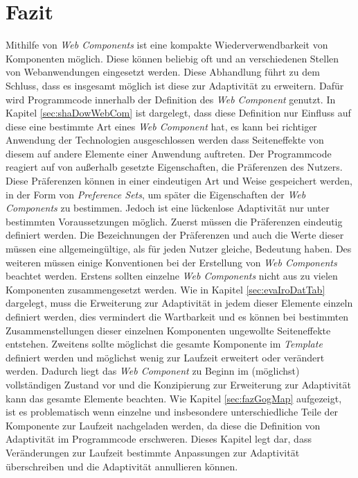 \documentclass[12pt, paper=a4, bibtotoc, toc=listof, headsepline=true, numbers=endperiod]{scrreprt}
\begin{document}
\chapter{Fazit}
Mithilfe von \emph{Web Components} ist eine kompakte Wiederverwendbarkeit von Komponenten möglich. Diese können beliebig oft und an verschiedenen Stellen von Webanwendungen eingesetzt werden. Diese Abhandlung führt zu dem Schluss, dass es insgesamt möglich ist diese zur Adaptivität zu erweitern. Dafür wird Programmcode innerhalb der Definition des \emph{Web Component} genutzt. In Kapitel \ref{sec:shaDowWebCom} ist dargelegt, dass diese Definition nur Einfluss auf diese eine bestimmte Art eines \emph{Web Component} hat, es kann bei richtiger Anwendung der Technologien ausgeschlossen werden dass Seiteneffekte von diesem auf andere Elemente einer Anwendung auftreten. Der Programmcode reagiert auf von außerhalb gesetzte Eigenschaften, die Präferenzen des Nutzers. Diese Präferenzen können in einer eindeutigen Art und Weise gespeichert werden, in der Form von \emph{Preference Sets}, um später die Eigenschaften der \emph{Web Components} zu bestimmen.
\newline
Jedoch ist eine lückenlose Adaptivität nur unter bestimmten Voraussetzungen möglich. Zuerst müssen die Präferenzen eindeutig definiert werden. Die Bezeichnungen der Präferenzen und auch die Werte dieser müssen eine allgemeingültige, als für jeden Nutzer gleiche, Bedeutung haben. Des weiteren müssen einige Konventionen bei der Erstellung von \emph{Web Components} beachtet werden. Erstens sollten einzelne \emph{Web Components} nicht aus zu vielen Komponenten zusammengesetzt werden. Wie in Kapitel \ref{sec:evaIroDatTab} dargelegt, muss die Erweiterung zur Adaptivität in jedem dieser Elemente einzeln definiert werden,  dies vermindert die Wartbarkeit und es können bei bestimmten Zusammenstellungen dieser einzelnen Komponenten ungewollte Seiteneffekte entstehen. Zweitens sollte möglichst die gesamte Komponente im \emph{Template} definiert werden und möglichst wenig zur Laufzeit erweitert oder verändert werden. Dadurch liegt das \emph{Web Component} zu Beginn im (möglichst) vollständigen Zustand vor und die Konzipierung zur Erweiterung zur Adaptivität kann das gesamte Elemente beachten. Wie Kapitel \ref{sec:fazGogMap} aufgezeigt, ist es problematisch wenn einzelne und insbesondere unterschiedliche Teile der Komponente zur Laufzeit nachgeladen werden, da diese die Definition von Adaptivität im Programmcode erschweren. Dieses Kapitel legt dar, dass Veränderungen zur Laufzeit bestimmte Anpassungen zur Adaptivität überschreiben und die Adaptivität annullieren können.
\end{document}
